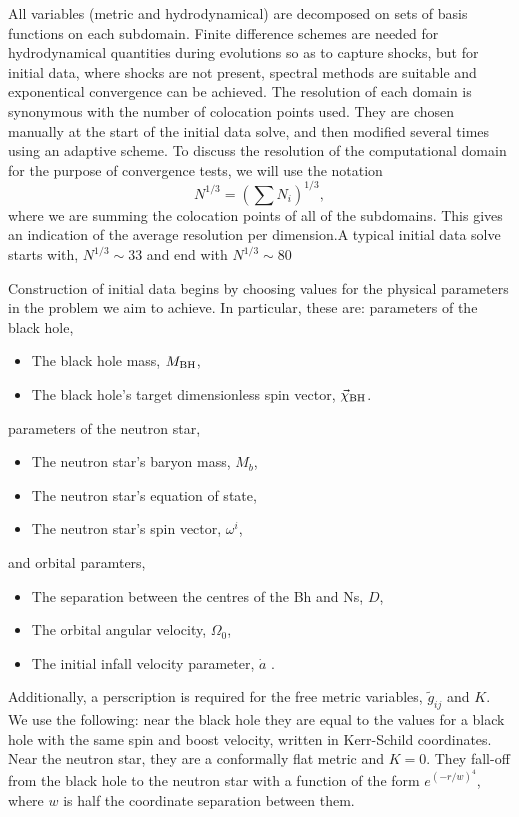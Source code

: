 All variables (metric and hydrodynamical) are decomposed on sets of
basis functions on each subdomain. Finite difference schemes are
needed for hydrodynamical quantities during evolutions so as to
capture shocks, but for initial data, where shocks are not present,
spectral methods are suitable and exponentical convergence can be
achieved. The resolution of each domain is synonymous with the
number of colocation points used. They are chosen manually at the
start of the initial data solve, and then modified several times using
an adaptive scheme.  To discuss the resolution of the computational domain for the purpose of convergence tests, we will use the notation
\begin{equation}
N^{1/3}=\left(\sum N_i\right)^{1/3},
\end{equation}
where we are summing the colocation points of all of the
subdomains. This gives an indication of the average resolution per dimension.A typical initial data solve starts with, $N^{1/3}\sim 33$ and end with $N^{1/3}\sim 80$

Construction of initial data begins by choosing values for the
physical parameters in the problem we aim to achieve. In particular,
these are: parameters of the black hole,
\begin{itemize}
\item The black hole mass, $M_{\rm BH}$,
\item The black hole's target dimensionless spin vector,
  $\vec{\chi}_{\rm BH}$.
\end{itemize}
parameters of the neutron star,
\begin{itemize}
\item The neutron star's baryon mass, $M_{b}$,
\item The neutron star's equation of state, 
\item The neutron star's spin vector, $\omega^i$,
\end{itemize}
and orbital paramters,
\begin{itemize}
\item The separation between the centres of the Bh and Ns, $D$,
\item The orbital angular velocity, $\Omega_0$,
\item The initial infall velocity parameter, $\dot{a}$
.
\end{itemize}
Additionally,  a perscription is required for the free
metric variables, $\tilde{g}_{ij}$ and $K$. We use the following: near the black hole they
are equal to the values for a black hole with the same spin and boost
velocity,
written in Kerr-Schild coordinates. Near the neutron star, they are a
conformally flat metric and $K=0$. They fall-off from the black hole
to the neutron star with a function of the form $e^{(-r/w)^4}$, where
$w$ is half the coordinate separation between them.

